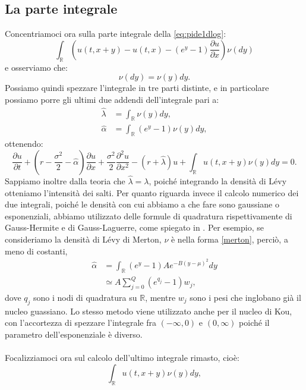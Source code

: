 \documentclass[a4paper,10pt]{report}
\newcommand{\der}[2]{\frac{\partial #1}{\partial #2}}
\newcommand{\dder}[2]{\frac{\partial^2 #1}{\partial #2^2}}
\theoremstyle{plain}
\theoremstyle{definition}
\theoremstyle{remark}
\begin{document}
\subsection{La parte integrale}
Concentriamoci ora sulla parte integrale della \ref{eq:pide1dlog}:$$\int_\mathbb{R}\left(u(t,x+y)-u(t,x)-(e^y-1)\der{u}{x}\right)\nu(dy)$$e osserviamo che:$$\nu(dy)=\nu(y)dy.$$ Possiamo quindi spezzare l'integrale in tre parti distinte, e in particolare possiamo porre gli ultimi due addendi dell'integrale pari a:
\begin{align*}
\hat{\lambda}&=\int_{\mathbb{R}}\nu(y)dy,\\
\hat{\alpha}&=\int_{\mathbb{R}}(e^y-1)\nu(y)dy,
\end{align*}
ottenendo: $$\der{u}{t}+\left(r-\frac{\sigma^2}{2}-\hat{\alpha}\right)\der{u}{x}+\frac{\sigma^2}{2}\dder{u}{x}-(r+\hat{\lambda})u+\int_\mathbb{R}u(t,x+y)\nu(y)dy=0.$$
Sappiamo inoltre dalla teoria che $\hat{\lambda}=\lambda$, poich\'e integrando la densit\`a di L\'evy otteniamo l'intensit\`a dei salti. Per quanto riguarda invece il calcolo numerico dei due integrali, poich\'e le densit\`a con cui abbiamo a che fare sono gaussiane o esponenziali, abbiamo utilizzato delle formule di quadratura rispettivamente di Gauss-Hermite e di Gauss-Laguerre, come spiegato in \cite{qss2007}. Per esempio, se consideriamo la densit\`a di L\'evy di Merton, $\nu$ \`e nella forma \ref{merton}, perci\`o, a meno di costanti,
\begin{align*}
\hat{\alpha}&=\int_{\mathbb{R}}(e^y-1)Ae^{-B(y-\mu)^2}dy\\
&\simeq A\sum_{j=0}^{Q}(e^{q_j}-1)w_j,
\end{align*}
dove $q_j$ sono i nodi di quadratura su $\mathbb{R}$, mentre $w_j$ sono i pesi che inglobano gi\`a il nucleo guassiano. Lo stesso metodo viene utilizzato anche per il nucleo di Kou, con l'accortezza di spezzare l'integrale fra $(-\infty,0)$ e $(0,\infty)$ poich\'e il parametro dell'esponenziale \`e diverso.\\\\Focalizziamoci ora sul calcolo dell'ultimo integrale rimasto, cio\`e:
\begin{equation}
\int_\mathbb{R}u(t,x+y)\nu(y)dy,
\label{intnonlocal}
\end{equation}
\end{document}
